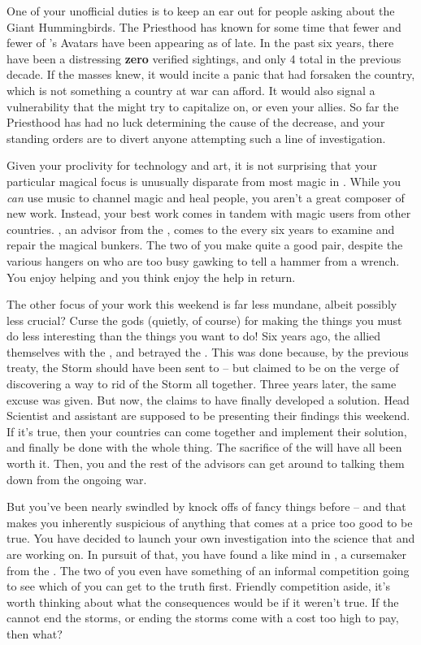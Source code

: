 \documentclass[char]{GL2020}
\begin{document}
One of your unofficial duties is to keep an ear out for people asking about the Giant Hummingbirds. The Priesthood has known for some time that fewer and fewer of \cFarmGod{}’s Avatars have been appearing as of late. In the past six years, there have been a distressing \textbf{zero} verified sightings, and only 4 total in the previous decade. If the masses knew, it would incite a panic that \cFarmGod{} had forsaken the country, which is not something a country at war can afford. It would also signal a vulnerability that the \pShippies{} might try to capitalize on, or even your \pTechies{} allies. So far the Priesthood has had no luck determining the cause of the decrease, and your standing orders are to divert anyone attempting such a line of investigation.

Given your proclivity for technology and art, it is not surprising that your particular magical focus is unusually disparate from most magic in \pFarm{}. While you \emph{can} use music to channel magic and heal people, you aren’t a great composer of new work. Instead, your best work comes in tandem with magic users from other countries. \cBunker{}, an advisor from the \pShip{}, comes to the \pSchool{} every six years to examine and repair the magical bunkers. The two of you make quite a good pair, despite the various hangers on who are too busy gawking to tell a hammer from a wrench. You enjoy helping \cBunker{\them} and you think \cBunker{\they} enjoy the help in return.

The other focus of your work this weekend is far less mundane, albeit possibly less crucial? Curse the gods (quietly, of course) for making the things you must do less interesting than the things you want to do! Six years ago, the \pFarm{} allied themselves with the \pTech{}, and betrayed the \pShip{}. This was done because, by the previous treaty, the Storm should have been sent to \pTech{} -- but \pTech{} claimed to be on the verge of discovering a way to rid \pEarth{} of the Storm all together. Three years later, the same excuse was given. But now, the \pTech{} claims to have finally developed a solution. Head Scientist \cHeadScientist{} and assistant \cAssistantScientist{} are supposed to be presenting their findings this weekend. If it’s true, then your countries can come together and implement their solution, and finally be done with the whole thing. The sacrifice of the \pShip{} will have all been worth it. Then, you and the rest of the advisors can get around to talking them down from the ongoing war.

But you’ve been nearly swindled by knock offs of fancy things before -- and that makes you inherently suspicious of anything that comes at a price too good to be true. You have decided to launch your own investigation into the science that \cHeadScientist{} and \cAssistantScientist{} are working on. In pursuit of that, you have found a like mind in \cCurse{}, a cursemaker from the \pFarm{}. The two of you even have something of an informal competition going to see which of you can get to the truth first. Friendly competition aside, it’s worth thinking about what the consequences would be if it weren’t true. If the \pTech{} cannot end the storms, or ending the storms come with a cost too high to pay, then what? 
\end{document}

